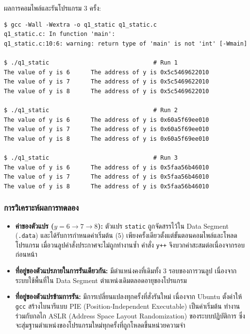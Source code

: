 \documentclass[a4paper,11pt]{article}
\newcommand{\code}[1]{\texttt{#1}}
\begin{document}
ผลการคอมไพล์และรันโปรแกรม 3 ครั้ง:

\begin{lstlisting}[style=terminal,caption={ผลการทดลอง Step 1 (รัน 3 ครั้ง)}]
$ gcc -Wall -Wextra -o q1_static q1_static.c
q1_static.c: In function 'main':
q1_static.c:10:6: warning: return type of 'main' is not 'int' [-Wmain]

$ ./q1_static                              # Run 1
The value of y is 6      The address of y is 0x5c5469622010
The value of y is 7      The address of y is 0x5c5469622010
The value of y is 8      The address of y is 0x5c5469622010

$ ./q1_static                              # Run 2
The value of y is 6      The address of y is 0x60a5f69ee010
The value of y is 7      The address of y is 0x60a5f69ee010
The value of y is 8      The address of y is 0x60a5f69ee010

$ ./q1_static                              # Run 3
The value of y is 6      The address of y is 0x5faa56b46010
The value of y is 7      The address of y is 0x5faa56b46010
The value of y is 8      The address of y is 0x5faa56b46010
\end{lstlisting}

\subsubsection{การวิเคราะห์ผลการทดลอง}

\begin{itemize}[leftmargin=*]
  \item \textbf{ค่าของตัวแปร ($y = 6 \to 7 \to 8$):} ตัวแปร \code{static} ถูกจัดสรรไว้ใน Data Segment (\code{.data}) และได้รับการกำหนดค่าเริ่มต้น ($5$) เพียงครั้งเดียวตั้งแต่ขั้นตอนคอมไพล์และโหลดโปรแกรม เมื่อวนลูปคำสั่งประกาศจะไม่ถูกทำงานซ้ำ คำสั่ง \code{y++} จึงบวกค่าสะสมต่อเนื่องจากรอบก่อนหน้า
  \item \textbf{ที่อยู่ของตัวแปรภายในการรันเดียวกัน:} มีตำแหน่งคงที่เดิมทั้ง 3 รอบของการวนลูป เนื่องจากระบบใช้พื้นที่ใน Data Segment ตำแหน่งเดิมตลอดอายุของโปรแกรม
  \item \textbf{ที่อยู่ของตัวแปรข้ามการรัน:} มีการเปลี่ยนแปลงทุกครั้งที่สั่งรันใหม่ เนื่องจาก Ubuntu ตั้งค่าให้ \code{gcc} สร้างไบนารีแบบ PIE (Position-Independent Executable) เป็นค่าเริ่มต้น ทำงานร่วมกับกลไก ASLR (Address Space Layout Randomization) ของระบบปฏิบัติการ ซึ่งจะสุ่มฐานตำแหน่งของโปรแกรมใหม่ทุกครั้งที่ถูกโหลดขึ้นหน่วยความจำ
\end{itemize}

\end{document}

